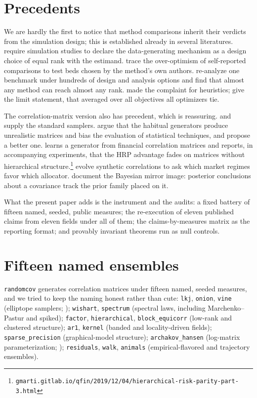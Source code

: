 \documentclass[11pt]{article}
\begin{document}
\section{Precedents}

We are hardly the first to notice that method comparisons inherit their
verdicts from the simulation design; this is established already in
several literatures. \citet{morris2019} require simulation studies to
declare the data-generating mechanism as a design choice of equal rank
with the estimand. \citet{boulesteix2013} trace the over-optimism of
self-reported comparisons to test beds chosen by the method's own
authors. \citet{niessl2022} re-analyze one benchmark under hundreds of
design and analysis options and find that almost any method can reach
almost any rank. \citet{hooker1995} made the complaint for heuristics;
\citet{wolpert1997} give the limit statement, that averaged over all
objectives all optimizers tie.

The correlation-matrix version also has precedent, which is reassuring.
\citet{joe2006} and \citet{lkj2009} supply the standard samplers.
\citet{hardin2013} argue that the habitual generators produce unrealistic
matrices and bias the evaluation of statistical techniques, and propose a
better one. \citet{marti2020} learns a generator from financial
correlation matrices and reports, in accompanying experiments, that the
HRP advantage fades on matrices without hierarchical
structure.\footnote{\texttt{gmarti.gitlab.io/qfin/2019/12/04/hierarchical-risk-parity-part-3.html}}
\citet{papenbrock2021} evolve synthetic correlations to ask which market
regimes favor which allocator. \citet{alvarez2014} document the Bayesian
mirror image: posterior conclusions about a covariance track the prior
family placed on it.

What the present paper adds is the instrument and the audits: a fixed
battery of fifteen named, seeded, public measures; the re-execution of
eleven published claims from eleven fields under all of them; the
claims-by-measures matrix as the reporting format; and provably invariant
theorems run as null controls.

\section{Fifteen named ensembles}

\texttt{randomcov} generates correlation matrices under fifteen named,
seeded measures, and we tried to keep the naming honest rather than
cute: \texttt{lkj}, \texttt{onion}, \texttt{vine} (elliptope samplers;
\citealp{joe2006,lkj2009}); \texttt{wishart}, \texttt{spectrum} (spectral laws, including
Marchenko--Pastur and spiked); \texttt{factor}, \texttt{hierarchical},
\texttt{block\_equicorr} (low-rank and clustered structure); \texttt{ar1},
\texttt{kernel} (banded and locality-driven fields);
\texttt{sparse\_precision} (graphical-model structure);
\texttt{archakov\_hansen} (log-matrix parameterization;
\citealp{archakov2021});
\texttt{residuals}, \texttt{walk}, \texttt{animals} (empirical-flavored
and trajectory ensembles).
\end{document}
